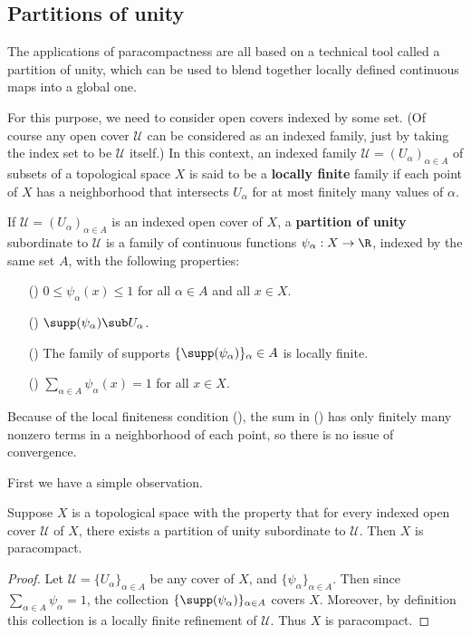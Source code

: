 \subsection{Partitions of unity}
The applications of paracompactness are all based on a technical tool called a partition of unity, which can be used to blend together locally defined continuous maps into a global one.\par
For this purpose, we need to consider open covers indexed by some set. (Of course any open cover $\mathcal{U}$ can be considered as an indexed family, just by taking the index set to be $\mathcal{U}$ itself.) In this context, an indexed family $\mathcal{U}=(U_\alpha)_{\alpha\in A}$ of subsets of a topological space $X$ is said to be a \textbf{locally finite} family if each point of $X$ has a neighborhood that intersects $U_\alpha$ for at most finitely many values of $\alpha$.\par
If $\mathcal{U}=(U_\alpha)_{\alpha\in A}$ is an indexed open cover of $X$, a \textbf{partition of unity} subordinate to $\mathcal{U}$ is a family of continuous functions $\psi_\alpha:X\to\R$, indexed by the same set $A$, with the following properties:
\begin{itemize}
\item[(\rmnum{1})] $0\leq\psi_\alpha(x)\leq 1$ for all $\alpha\in A$ and all $x\in X$.
\item[(\rmnum{2})] $\supp(\psi_\alpha)\sub U_\alpha$.
\item[(\rmnum{3})] The family of supports $\{\supp(\psi_\alpha)\}_\alpha\in A$ is locally finite.
\item[(\rmnum{4})] $\sum_{\alpha\in A}\psi_\alpha(x)=1$ for all $x\in X$.
\end{itemize}
Because of the local finiteness condition (), the sum in () has only finitely many nonzero terms in a neighborhood of each point, so there is no issue of convergence.\par
First we have a simple observation.
\begin{proposition}\label{partition of unity para}
Suppose $X$ is a topological space with the property that for every indexed open cover $\mathcal{U}$ of $X$, there exists a partition of unity subordinate to $\mathcal{U}$. Then $X$ is paracompact.
\end{proposition}
\begin{proof}
Let $\mathcal{U}=\{U_\alpha\}_{\alpha\in A}$ be any cover of $X$, and $\{\psi_\alpha\}_{\alpha\in A}$. Then since $\sum_{\alpha\in A}\psi_\alpha=1$, the collection $\{\supp(\psi_\alpha)\}_{\alpha\in A}$ covers $X$. Moreover, by definition this collection is a locally finite refinement of $\mathcal{U}$. Thus $X$ is paracompact.
\end{proof}
